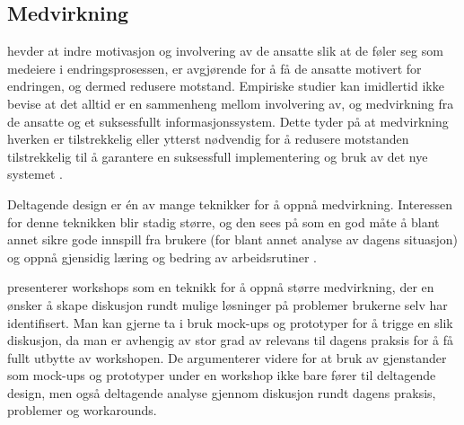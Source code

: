 \subsection{Medvirkning}
\label{sec:medvirkning}
\citet{Jacobsen12} hevder at indre motivasjon og involvering av de ansatte slik at de føler seg som medeiere i endringsprosessen, er avgjørende for å få de ansatte motivert for endringen, og dermed redusere motstand. Empiriske studier kan imidlertid ikke bevise at det alltid er en sammenheng mellom involvering av, og medvirkning fra de ansatte og et suksessfullt informasjonssystem. Dette tyder på at medvirkning hverken er tilstrekkelig eller ytterst nødvendig for å redusere motstanden tilstrekkelig til å garantere en suksessfull implementering og bruk av det nye systemet \citep{Cavaye95}.
 
\noindent
Deltagende design er én av mange teknikker for å oppnå medvirkning.
Interessen for denne teknikken blir stadig større, og den sees på som en god måte å blant annet sikre gode innspill fra brukere (for blant annet analyse av dagens situasjon) og oppnå gjensidig læring og bedring av arbeidsrutiner \citep{Mogensen92}.
 
\noindent
\citet{Mogensen92} presenterer workshops som en teknikk for å oppnå større medvirkning, der en ønsker å skape diskusjon rundt mulige løsninger på problemer brukerne selv har identifisert. Man kan gjerne ta i bruk mock-ups og prototyper for å trigge en slik diskusjon, da man er avhengig av stor grad av relevans til dagens praksis for å få fullt utbytte av workshopen. De argumenterer videre for at bruk av gjenstander som mock-ups og prototyper under en workshop ikke bare fører til deltagende design, men også deltagende analyse gjennom diskusjon rundt dagens praksis, problemer og workarounds.